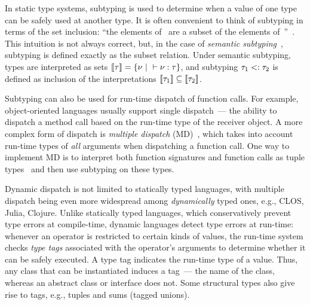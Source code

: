 
In static type systems, subtyping is used to determine
when a value of one type can be safely used at another type.
It is often convenient to think of subtyping 
in terms of the set inclusion: ``the elements of~ are a subset
of the elements of~''~\cite{bib:Pierce:2002:TAPL}.
This intuition is not always correct, but, in the case of
\emph{semantic subtyping}~\cite{bib:Hosoya:2003:XDuce,
	bib:Frisch:2008:sem-sub, bib:Ancona:2016:sem-sub-oo}, 
subtyping is defined exactly as the subset relation. %
Under semantic subtyping, types are interpreted as sets
$\llbracket \tau \rrbracket = \{\nu ~\vert~ \vdash \nu : \tau \}$, 
and subtyping $\tau_1 <: \tau_2$ is defined as inclusion 
of the interpretations
$\llbracket \tau_1 \rrbracket \subseteq \llbracket \tau_2 \rrbracket$.

Subtyping can also be used for run-time dispatch of function calls.
For example, object-oriented languages
usually support single dispatch~--- the ability to dispatch a method call 
based on the run-time type of the receiver object.
A more complex form of dispatch is \emph{multiple dispatch}
(MD)~\cite{bib:Chambers:1992:Cecil,bib:Clifton:2000:MultiJava},
which takes into account run-time types of \emph{all} arguments
when dispatching a function call.
One way to implement MD is to interpret both function signatures
and function calls
as tuple types~\cite{bib:Leavens:1998:mddtuples}
and then use subtyping on these types.

Dynamic dispatch is not limited to statically typed languages,
with multiple dispatch being even more widespread among 
\emph{dynamically} typed ones, e.g., CLOS, Julia, Clojure.
Unlike statically typed languages, 
which conservatively prevent type errors at compile-time, %
dynamic languages detect type errors at run-time:
whenever an operator is restricted to certain kinds of values,
the run-time system checks \emph{type tags} associated 
with the operator's arguments
to determine whether it can be safely executed.
A type tag indicates the run-time type of a value.
Thus, any class that can be instantiated induces a tag~--- 
the name of the class, 
whereas an abstract class or interface does not.
Some structural types also give rise to tags, 
e.g., tuples and sums (tagged unions).

